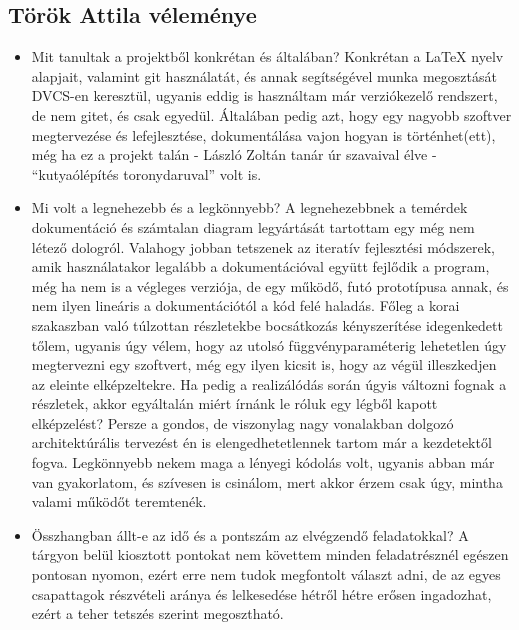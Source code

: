 \subsection{Török Attila véleménye}
\begin{itemize}

\item Mit tanultak a projektből konkrétan és általában? \newline
Konkrétan a \LaTeX{} nyelv alapjait, valamint git használatát, és annak segítségével munka megosztását DVCS-en keresztül, ugyanis eddig is használtam már verziókezelő rendszert, de nem gitet, és csak egyedül. Általában pedig azt, hogy egy nagyobb szoftver megtervezése és lefejlesztése, dokumentálása vajon hogyan is történhet(ett), még ha ez a projekt talán - László Zoltán tanár úr szavaival élve - ``kutyaólépítés toronydaruval'' volt is.

\item Mi volt a legnehezebb és a legkönnyebb? \newline
A legnehezebbnek a temérdek dokumentáció és számtalan diagram legyártását tartottam egy még nem létező dologról. Valahogy jobban tetszenek az iteratív fejlesztési módszerek, amik használatakor legalább a dokumentációval együtt fejlődik a program, még ha nem is a végleges verziója, de egy működő, futó prototípusa annak, és nem ilyen lineáris a dokumentációtól a kód felé haladás. Főleg a korai szakaszban való túlzottan részletekbe bocsátkozás kényszerítése idegenkedett tőlem, ugyanis úgy vélem, hogy az utolsó függvényparaméterig lehetetlen úgy megtervezni egy szoftvert, még egy ilyen kicsit is, hogy az végül illeszkedjen az eleinte elképzeltekre. Ha pedig a realizálódás során úgyis változni fognak a részletek, akkor egyáltalán miért írnánk le róluk egy légből kapott elképzelést? Persze a gondos, de viszonylag nagy vonalakban dolgozó architektúrális tervezést én is elengedhetetlennek tartom már a kezdetektől fogva.
Legkönnyebb nekem maga a lényegi kódolás volt, ugyanis abban már van gyakorlatom, és szívesen is csinálom, mert akkor érzem csak úgy, mintha valami működőt teremtenék.

\item Összhangban állt-e az idő és a pontszám az elvégzendő feladatokkal? \newline
A tárgyon belül kiosztott pontokat nem követtem minden feladatrésznél egészen pontosan nyomon, ezért erre nem tudok megfontolt választ adni, de az egyes csapattagok részvételi aránya és lelkesedése hétről hétre erősen ingadozhat, ezért a teher tetszés szerint megosztható.


\end{itemize}

